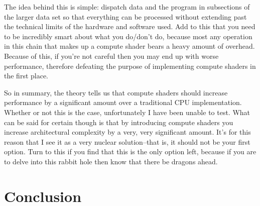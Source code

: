 \documentclass{article}
\begin{document}
The idea behind this is simple: dispatch data and the program in subsections of
the larger data set so that everything can be processed without extending past
the technical limits of the hardware and software used. Add to this that you
need to be incredibly smart about what you do/don't do, because most any
operation in this chain that makes up a compute shader bears a heavy amount of
overhead. Because of this, if you're not careful then you may end up with worse
performance, therefore defeating the purpose of implementing compute shaders in
the first place.

So in summary, the theory tells us that compute shaders should increase
performance by a significant amount over a traditional CPU implementation.
Whether or not this is the case, unfortunately I have been unable to test. What
can be said for certain though is that by introducing compute shaders you
increase architectural complexity by a very, very significant amount. It's for
this reason that I see it as a very nuclear solution--that is, it should not be
your first option. Turn to this if you find that this is the only option left,
because if you are to delve into this rabbit hole then know that there be
dragons ahead.

\section{Conclusion}
\end{document}
